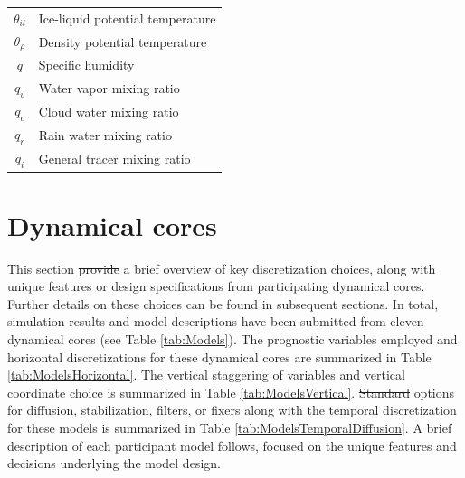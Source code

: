 \documentclass[gmd, manuscript]{copernicus}
\providecommand{\DIFadd}[1]{{\protect\color{blue}\uwave{#1}}} %
\providecommand{\DIFdel}[1]{{\protect\color{red}\sout{#1}}}                      %
\providecommand{\DIFaddbegin}{} %
\providecommand{\DIFaddend}{} %
\providecommand{\DIFdelbegin}{} %
\providecommand{\DIFdelend}{} %
\begin{document}
\begin{table}[p]
\begin{center}
\begin{tabular}{cl}
$\theta_{il}$ & Ice-liquid potential temperature \\
$\theta_\rho$ & Density potential temperature \\
$q$ & Specific humidity \\
$q_v$ & Water vapor mixing ratio \\
$q_c$ & Cloud water mixing ratio \\
$q_r$ & Rain water mixing ratio \\
$q_i$ & General tracer mixing ratio \\
\hline 
\end{tabular}
\end{center}
\end{table}



\section{Dynamical cores} \label{sec:DynamicalCores}

This section \DIFdelbegin \DIFdel{provide }\DIFdelend \DIFaddbegin \DIFadd{provides }\DIFaddend a brief overview of key discretization choices, along with unique features or design specifications from participating dynamical cores.  Further details on these choices can be found in subsequent sections.  In total, simulation results and model descriptions have been submitted from eleven dynamical cores (see Table \ref{tab:Models}).  The prognostic variables employed and horizontal discretizations for these dynamical cores are summarized in Table \ref{tab:ModelsHorizontal}.  The vertical staggering of variables and vertical coordinate choice is summarized in Table \ref{tab:ModelsVertical}.  \DIFdelbegin \DIFdel{Standard }\DIFdelend \DIFaddbegin \DIFadd{Principal }\DIFaddend options for diffusion, stabilization, filters, or fixers along with the temporal discretization for these models is summarized in Table \ref{tab:ModelsTemporalDiffusion}.  A brief description of each participant model follows, focused on the unique features and decisions underlying the model design.

\end{document}
